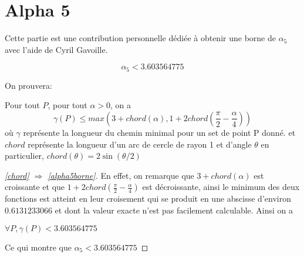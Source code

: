 \section{Alpha 5}

Cette partie est une contribution personnelle dédiée à obtenir une borne de $\alpha_5$ avec l'aide de Cyril Gavoille.

\begin{theorem}\label{alpha5borne}

$$\alpha_5 < 3.603564775$$

\end{theorem}

On prouvera:

\begin{lemma}\label{chord}
Pour tout $P$, pour tout $\alpha >0$, on a
$$\gamma(P) \leq max\left(3 + chord\left(\alpha\right), 1 + 2chord\left(\frac{\pi}{2} - \frac{\alpha}{4}\right)\right)$$
où $\gamma$ représente la longueur du chemin minimal pour un set de point P donné. et $chord$ représente la longueur d'un arc de cercle de rayon 1 et d'angle $\theta$ en particulier, $chord(\theta) = 2\sin(\theta/2)$
\end{lemma}

\begin{proof}[\ref{chord} $\Rightarrow$ \ref{alpha5borne}]
En effet, on remarque que $3+chord(\alpha)$ est croissante et que $1 + 2chord(\frac{\pi}{2} - \frac{\alpha}{4})$ est décroissante, ainsi le minimum des deux fonctions est atteint en leur croisement qui se produit en une abscisse d'environ $0.6131233066$ et dont la valeur exacte n'est pas facilement calculable. Ainsi on a

\(\forall P, \gamma(P) < 3.603564775\)

Ce qui montre que $\alpha_5 < 3.603564775$

\end{proof}

